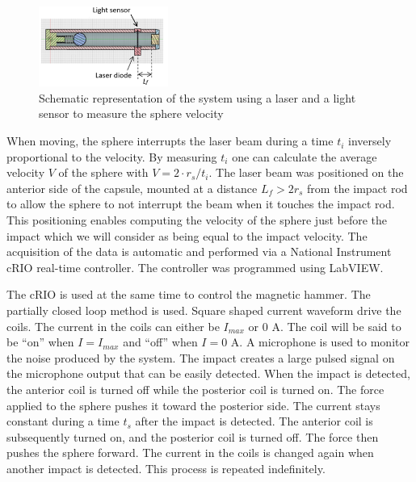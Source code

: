 \documentclass[letterpaper, 10 pt, conference]{ieeeconf}  %
\begin{document}
\begin{figure}
    \centering
  \includegraphics[width=120pt]{laser_system.png}
  \caption{Schematic representation of the system using a laser and a light sensor to measure the sphere velocity}
  \label{laser_system}
\end{figure}

When moving, the sphere interrupts the laser beam during a time $t_i$ inversely proportional to the velocity. By measuring $t_i$ one can calculate the average velocity $V$ of the sphere with $V=2\cdot r_s/t_i$. The laser beam was positioned on the anterior side of the capsule, mounted at a distance $L_f>2r_s$ from the impact rod to allow the sphere to not interrupt the beam when it touches the impact rod. This positioning enables computing the velocity of the sphere just before the impact which we will consider as being equal to the impact velocity. The acquisition of the data is automatic and performed via a National Instrument cRIO real-time controller. The controller was programmed using LabVIEW.\par 
The cRIO is used at the same time to control the magnetic hammer. The partially closed loop method is used. Square shaped current waveform drive the coils. The current in the coils can either be $I_{max}$ or 0 A. The coil will be said to be ``on'' when $I=I_{max}$ and ``off'' when $I=0$ A. A microphone is used to monitor the noise produced by the system. The impact creates a large pulsed signal on the microphone output that can be easily detected. When the impact is detected, the anterior coil is turned off while the posterior coil is turned on. The force applied to the sphere pushes it toward the posterior side. The current stays constant during a time $t_s$ after the impact is detected. The anterior coil is subsequently turned on, and the posterior coil is turned off. The force then pushes the sphere forward. The current in the coils is changed again when another impact is detected. This process is repeated indefinitely.\par
\end{document}
